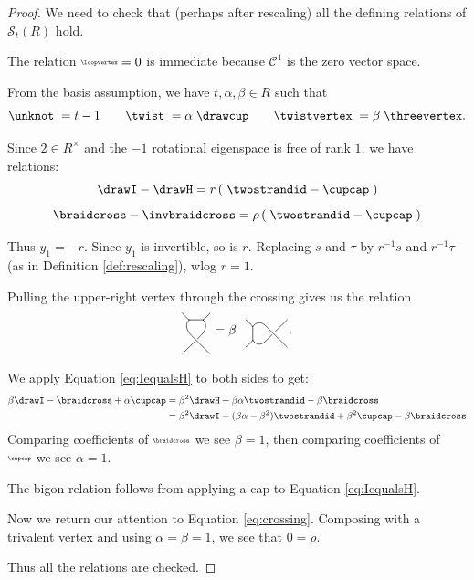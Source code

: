 \documentclass[12pt]{amsart}
\begin{document}
\begin{proof}
    We need to check that (perhaps after rescaling) all the defining relations of $\mathcal{S}_t(R)$ hold.

    The relation $\smallfig{\loopvertex} = 0$ is immediate because $\mathcal{C}^1$ is the zero vector space.

    From the basis assumption, we have $t,\alpha,\beta \in R$ such that 
    \[\unknot\; = t-1 \qquad
      \twist\; =  \alpha \;\drawcup \qquad
        \twistvertex\; =  \beta \;\threevertex.\]

    Since $2 \in R^\times$ and the $-1$ rotational eigenspace is free of rank $1$, we have relations:
    \begin{equation} \label{eq:IequalsH}
        \drawI - \drawH = r \left(\; \twostrandid -\cupcap \; \right)
    \end{equation}
    \begin{equation} \label{eq:crossing}
    \braidcross - \invbraidcross = \rho \left(\; \twostrandid -\cupcap \; \right)    
    \end{equation}
    
    Thus $y_1 = -r$. Since $y_1$ is invertible, so is $r$. Replacing $s$ and $\tau$ by $r^{-1}s$ and $r^{-1}\tau$ (as in Definition \ref{def:rescaling}), wlog $r = 1$.

    Pulling the upper-right vertex through the crossing gives us the relation
    \begin{equation}
         \twistone = \beta \hspace{0.1in} \twisttwo.
    \end{equation}
    
   We apply Equation \ref{eq:IequalsH} to both sides to get:
   \begin{align*}
       \beta \drawI - \braidcross + \alpha \cupcap &= \beta^2 \drawH  + \beta \alpha \twostrandid - \beta \braidcross \\ &= \beta^2 \drawI + (\beta \alpha-\beta^2) \twostrandid + \beta^2 \cupcap - \beta \braidcross
   \end{align*}
   Comparing coefficients of $\smallfig{\braidcross}$ we see $\beta = 1$, then comparing coefficients of $\smallfig{\cupcap}$ we see $\alpha = 1$.

   The bigon relation follows from applying a cap to Equation \ref{eq:IequalsH}.

   Now we return our attention to Equation \ref{eq:crossing}. Composing with a trivalent vertex and using $\alpha = \beta = 1$, we see that $0 = \rho$.

   Thus all the relations are checked.
\end{proof}
\end{document}
